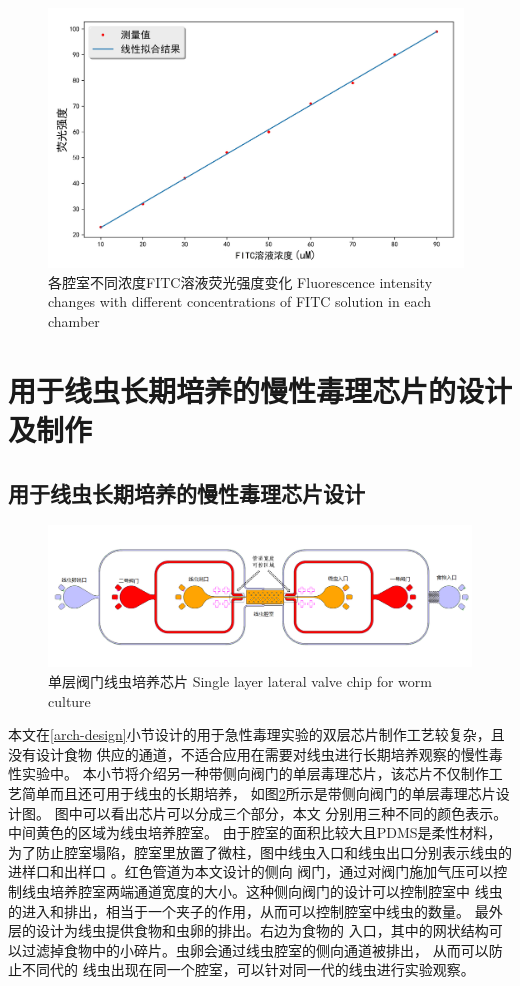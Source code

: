 	\begin{figure}[htbp]
	  \centering
	  \includegraphics[width=11cm]{figure/chap2/fluence.jpg}
	  \bicaption
		{各腔室不同浓度FITC溶液荧光强度变化}
		{Fluorescence intensity changes with different concentrations of FITC solution in each chamber}
	  \label{fig:chap2:fluence}
	\end{figure}
\section{用于线虫长期培养的慢性毒理芯片的设计及制作}
\subsection{用于线虫长期培养的慢性毒理芯片设计}
\label{subsec:chipdesign}
	\begin{figure}[!b]
	  \centering
	  \includegraphics[width=14cm]{figure/chap2/arch-chip.png}
	  \bicaption
		{单层阀门线虫培养芯片}
		{Single layer lateral valve chip for  worm culture}
	  \label{fig:chap2:singlelayer}
	\end{figure}
	本文在\ref{arch-design}小节设计的用于急性毒理实验的双层芯片制作工艺较复杂，且没有设计食物
	供应的通道，不适合应用在需要对线虫进行长期培养观察的慢性毒性实验中。
	本小节将介绍另一种带侧向阀门的单层毒理芯片，该芯片不仅制作工艺简单而且还可用于线虫的长期培养，
    如图\ref{fig:chap2:singlelayer}所示是带侧向阀门的单层毒理芯片设计图。
	图中可以看出芯片可以分成三个部分，本文
	分别用三种不同的颜色表示。中间黄色的区域为线虫培养腔室。
	由于腔室的面积比较大且PDMS是柔性材料，
	为了防止腔室塌陷，腔室里放置了微柱，图中线虫入口和线虫出口分别表示线虫的进样口和出样口
	。红色管道为本文设计的侧向
	阀门，通过对阀门施加气压可以控制线虫培养腔室两端通道宽度的大小。这种侧向阀门的设计可以控制腔室中
	线虫的进入和排出，相当于一个夹子的作用，从而可以控制腔室中线虫的数量。
	最外层的设计为线虫提供食物和虫卵的排出。右边为食物的
	入口，其中的网状结构可以过滤掉食物中的小碎片。虫卵会通过线虫腔室的侧向通道被排出，
	从而可以防止不同代的
	线虫出现在同一个腔室，可以针对同一代的线虫进行实验观察。

